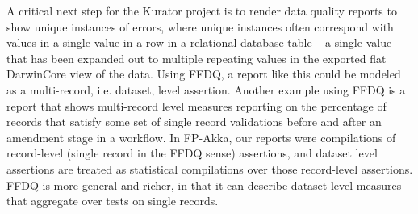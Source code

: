 \documentclass{article}
\begin{document}
A critical next step for the Kurator project is to render data quality reports to show unique instances of errors, where unique instances often correspond with values in a single value in a row in a relational database table – a single value that has been expanded out to multiple repeating values in the exported flat DarwinCore view of the data.
Using FFDQ, a report like this could be modeled as a multi-record, i.e. dataset, level assertion. Another example using FFDQ is a report that shows multi-record level measures reporting on the percentage of records that satisfy some set of single record validations before and after an amendment stage in a workflow.  
In FP-Akka, our reports were compilations of record-level (single record in the FFDQ sense) assertions, and dataset level assertions are treated as statistical compilations over those record-level assertions.  FFDQ is more general and richer, in that it can describe dataset level measures that aggregate over tests on single records.  

%
\end{document}

